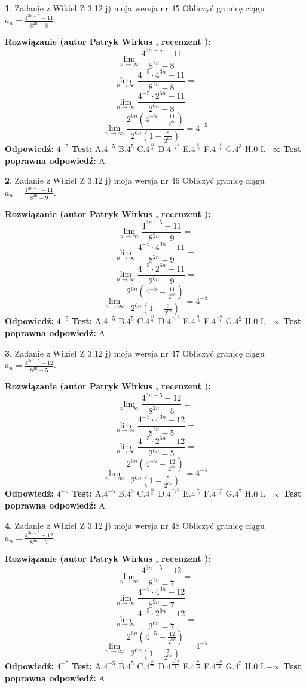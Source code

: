 \documentclass[12pt, a4paper]{article}
\theoremstyle{definition} %
\newtheorem{zad}{}
\newcommand{\zadStart}[1]{\begin{zad}#1\newline}
\newcommand{\zadStop}{\end{zad}}
\newcommand{\rozwStart}[2]{\noindent \textbf{Rozwiązanie (autor #1 , recenzent #2): }\newline}
\newcommand{\rozwStop}{\newline}
\newcommand{\odpStart}{\noindent \textbf{Odpowiedź:}\newline}
\newcommand{\odpStop}{\newline}
\newcommand{\testStart}{\noindent \textbf{Test:}\newline}
\newcommand{\testStop}{\newline}
\newcommand{\kluczStart}{\noindent \textbf{Test poprawna odpowiedź:}\newline}
\newcommand{\kluczStop}{\newline}
\begin{document}
\zadStart{Zadanie z Wikieł Z 3.12 j) moja wersja nr 45}
Obliczyć granicę ciągu $a_{n}=\frac{4^{3n-5}-11}{8^{2n}-8}$.
\zadStop
\rozwStart{Patryk Wirkus}{}
$$\lim\limits_{n\to\infty}\frac{4^{3n-5}-11}{8^{2n}-8}=$$
$$\lim\limits_{n\to\infty}\frac{4^{-5} \cdot 4^{3n}-11}{8^{2n}-8}=$$
$$\lim\limits_{n\to\infty}\frac{4^{-5} \cdot 2^{6n}-11}{2^{6n}-8}=$$
$$\lim\limits_{n\to\infty}\frac{2^{6n}(4^{-5} - \frac{11}{2^{6n}})}{2^{6n}(1-\frac{8}{2^{6n}})}= 4^{-5}$$
\rozwStop
\odpStart
$4^{-5}$
\odpStop
\testStart
A.$4^{-5}$
B.$4^{5}$
C.$4^{\frac{11}{8}}$
D.$4^{\frac{-11}{8}}$
E.$4^{\frac{8}{11}}$
F.$4^{\frac{-8}{11}}$
G.$4^{3}$
H.$0$
I.$-\infty$
\testStop
\kluczStart
A
\kluczStop



\zadStart{Zadanie z Wikieł Z 3.12 j) moja wersja nr 46}
Obliczyć granicę ciągu $a_{n}=\frac{4^{3n-5}-11}{8^{2n}-9}$.
\zadStop
\rozwStart{Patryk Wirkus}{}
$$\lim\limits_{n\to\infty}\frac{4^{3n-5}-11}{8^{2n}-9}=$$
$$\lim\limits_{n\to\infty}\frac{4^{-5} \cdot 4^{3n}-11}{8^{2n}-9}=$$
$$\lim\limits_{n\to\infty}\frac{4^{-5} \cdot 2^{6n}-11}{2^{6n}-9}=$$
$$\lim\limits_{n\to\infty}\frac{2^{6n}(4^{-5} - \frac{11}{2^{6n}})}{2^{6n}(1-\frac{9}{2^{6n}})}= 4^{-5}$$
\rozwStop
\odpStart
$4^{-5}$
\odpStop
\testStart
A.$4^{-5}$
B.$4^{5}$
C.$4^{\frac{11}{9}}$
D.$4^{\frac{-11}{9}}$
E.$4^{\frac{9}{11}}$
F.$4^{\frac{-9}{11}}$
G.$4^{2}$
H.$0$
I.$-\infty$
\testStop
\kluczStart
A
\kluczStop



\zadStart{Zadanie z Wikieł Z 3.12 j) moja wersja nr 47}
Obliczyć granicę ciągu $a_{n}=\frac{4^{3n-5}-12}{8^{2n}-5}$.
\zadStop
\rozwStart{Patryk Wirkus}{}
$$\lim\limits_{n\to\infty}\frac{4^{3n-5}-12}{8^{2n}-5}=$$
$$\lim\limits_{n\to\infty}\frac{4^{-5} \cdot 4^{3n}-12}{8^{2n}-5}=$$
$$\lim\limits_{n\to\infty}\frac{4^{-5} \cdot 2^{6n}-12}{2^{6n}-5}=$$
$$\lim\limits_{n\to\infty}\frac{2^{6n}(4^{-5} - \frac{12}{2^{6n}})}{2^{6n}(1-\frac{5}{2^{6n}})}= 4^{-5}$$
\rozwStop
\odpStart
$4^{-5}$
\odpStop
\testStart
A.$4^{-5}$
B.$4^{5}$
C.$4^{\frac{12}{5}}$
D.$4^{\frac{-12}{5}}$
E.$4^{\frac{5}{12}}$
F.$4^{\frac{-5}{12}}$
G.$4^{7}$
H.$0$
I.$-\infty$
\testStop
\kluczStart
A
\kluczStop



\zadStart{Zadanie z Wikieł Z 3.12 j) moja wersja nr 48}
Obliczyć granicę ciągu $a_{n}=\frac{4^{3n-5}-12}{8^{2n}-7}$.
\zadStop
\rozwStart{Patryk Wirkus}{}
$$\lim\limits_{n\to\infty}\frac{4^{3n-5}-12}{8^{2n}-7}=$$
$$\lim\limits_{n\to\infty}\frac{4^{-5} \cdot 4^{3n}-12}{8^{2n}-7}=$$
$$\lim\limits_{n\to\infty}\frac{4^{-5} \cdot 2^{6n}-12}{2^{6n}-7}=$$
$$\lim\limits_{n\to\infty}\frac{2^{6n}(4^{-5} - \frac{12}{2^{6n}})}{2^{6n}(1-\frac{7}{2^{6n}})}= 4^{-5}$$
\rozwStop
\odpStart
$4^{-5}$
\odpStop
\testStart
A.$4^{-5}$
B.$4^{5}$
C.$4^{\frac{12}{7}}$
D.$4^{\frac{-12}{7}}$
E.$4^{\frac{7}{12}}$
F.$4^{\frac{-7}{12}}$
G.$4^{5}$
H.$0$
I.$-\infty$
\testStop
\kluczStart
A
\kluczStop
\end{document}
